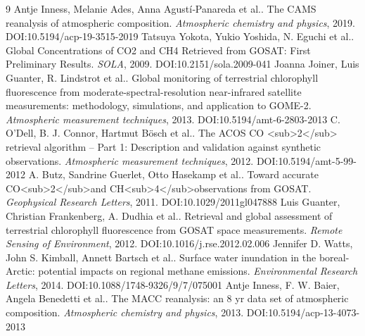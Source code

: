 \documentclass[11pt]{article}
\begin{document}
\begin{thebibliography}{9}
 Antje Inness, Melanie Ades, Anna Agustí‐Panareda et al.. The CAMS reanalysis of atmospheric composition. \emph{Atmospheric chemistry and physics}, 2019. DOI:10.5194/acp-19-3515-2019
 Tatsuya Yokota, Yukio Yoshida, N. Eguchi et al.. Global Concentrations of CO2 and CH4 Retrieved from GOSAT: First Preliminary Results. \emph{SOLA}, 2009. DOI:10.2151/sola.2009-041
 Joanna Joiner, Luis Guanter, R. Lindstrot et al.. Global monitoring of terrestrial chlorophyll fluorescence from moderate-spectral-resolution near-infrared satellite measurements: methodology, simulations, and application to GOME-2. \emph{Atmospheric measurement techniques}, 2013. DOI:10.5194/amt-6-2803-2013
 C. O’Dell, B. J. Connor, Hartmut Bösch et al.. The ACOS CO <sub>2</sub> retrieval algorithm – Part 1: Description and validation against synthetic observations. \emph{Atmospheric measurement techniques}, 2012. DOI:10.5194/amt-5-99-2012
 A. Butz, Sandrine Guerlet, Otto Hasekamp et al.. Toward accurate CO<sub>2</sub>and CH<sub>4</sub>observations from GOSAT. \emph{Geophysical Research Letters}, 2011. DOI:10.1029/2011gl047888
 Luis Guanter, Christian Frankenberg, A. Dudhia et al.. Retrieval and global assessment of terrestrial chlorophyll fluorescence from GOSAT space measurements. \emph{Remote Sensing of Environment}, 2012. DOI:10.1016/j.rse.2012.02.006
 Jennifer D. Watts, John S. Kimball, Annett Bartsch et al.. Surface water inundation in the boreal-Arctic: potential impacts on regional methane emissions. \emph{Environmental Research Letters}, 2014. DOI:10.1088/1748-9326/9/7/075001
 Antje Inness, F. W. Baier, Angela Benedetti et al.. The MACC reanalysis: an 8 yr data set of atmospheric composition. \emph{Atmospheric chemistry and physics}, 2013. DOI:10.5194/acp-13-4073-2013
\end{thebibliography}
\end{document}
